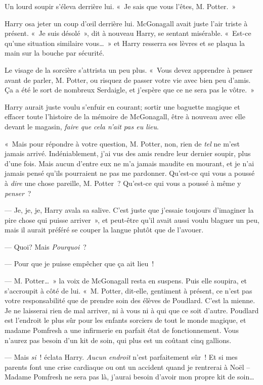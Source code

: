 Un lourd soupir s'éleva derrière lui. «~Je sais que vous l'êtes, M. Potter.~»

Harry osa jeter un coup d'œil derrière lui.
McGonagall avait juste l'air triste à présent.
«~Je suis désolé~», dit à nouveau Harry, se sentant misérable.
«~Est-ce qu'une situation similaire vous…~» et Harry resserra ses lèvres et se plaqua la main sur la bouche par sécurité.

Le visage de la sorcière s'attrista un peu plus.
«~Vous devez apprendre à penser avant de parler, M. Potter, ou risquez de passer votre vie avec bien peu d'amis.
Ça a été le sort de nombreux Serdaigle, et j'espère que ce ne sera pas le vôtre.~»

Harry aurait juste voulu s'enfuir en courant; sortir une baguette magique et effacer toute l'histoire de la mémoire de McGonagall, être à nouveau avec elle devant le magasin, \emph{faire que cela n'ait pas eu lieu}.

«~Mais pour répondre à votre question, M. Potter, non, rien de \emph{tel} ne m'est jamais arrivé.
Indéniablement, j'ai vus des amis rendre leur dernier soupir, plus d'une fois.
Mais aucun d'entre eux ne m'a jamais maudite en mourant, et je n'ai jamais pensé qu'ils pourraient ne pas me pardonner.
Qu'est-ce qui vous a poussé à \emph{dire} une chose pareille, M. Potter~? Qu'est-ce qui vous a poussé à même y \emph{penser}~?

--- Je, je,  je, Harry avala sa salive. C'est juste que j'essaie toujours d'imaginer la pire chose qui puisse arriver~», et peut-être qu'il avait aussi voulu blaguer un peu, mais il aurait préféré se couper la langue plutôt que de l'avouer.

--- Quoi? Mais \emph{Pourquoi}~?

--- Pour que je puisse empêcher que ça ait lieu~!

--- M. Potter…~» la voix de McGonagall resta en suspens.  Puis elle soupira, et s'accroupit à côté de lui.
«~M. Potter, dit-elle, gentiment à présent, ce n'est pas votre responsabilité que de prendre soin des élèves de Poudlard. C'est la mienne.
Je ne laisserai rien de mal arriver, ni à vous ni à qui que ce soit d'autre.
Poudlard est l'endroit le plus sûr pour les enfants sorciers de tout le monde magique, et madame Pomfresh a une infirmerie en parfait état de fonctionnement.
Vous n'aurez pas besoin d'un kit de soin, qui plus est un coûtant cinq gallions.

--- Mais \emph{si}~! éclata Harry. \emph{Aucun endroit} n'est parfaitement sûr~! Et si mes parents font une crise cardiaque ou ont un accident quand je rentrerai à Noël -- Madame Pomfresh ne sera pas là, j'aurai besoin d'avoir mon propre kit de soin…

